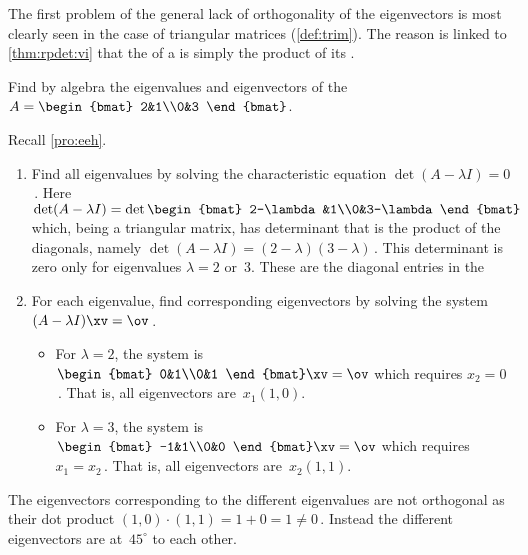 \begin{enumerate}
\end{enumerate}


The first problem of the general lack of orthogonality of the eigenvectors is most clearly seen in the case of triangular matrices (\cref{def:trim}).
The reason is  linked to \cref{thm:rpdet:vi} that the  of a  is simply the product of its .

\begin{example} 
Find by algebra the eigenvalues and eigenvectors of the  \(A=\begin{bmat} 2&1\\0&3 \end{bmat}\).
\begin{solution} 
Recall \cref{pro:eeh}. 
\begin{enumerate}
\item Find all eigenvalues by solving the characteristic equation \(\det(A-\lambda I)=0\)\,. 
Here \(\det(A-\lambda I)=\det\begin{bmat} 2-\lambda&1\\0&3-\lambda \end{bmat}\) which, being a triangular matrix, has determinant that is the product of the diagonals, namely \(\det(A-\lambda I)=(2-\lambda)(3-\lambda)\)\,.
This determinant is zero only for eigenvalues \(\lambda=2\) or~\(3\).
These are the diagonal entries in the 
\item For each eigenvalue, find corresponding eigenvectors by solving the system \((A-\lambda I)\xv=\ov\)\,.
\begin{itemize}
\item For \(\lambda=2\), the system is \(\begin{bmat} 0&1\\0&1 \end{bmat}\xv=\ov\) which requires \(x_2=0\)\,.  That is, all eigenvectors are~\(x_1(1,0)\).
\item For \(\lambda=3\), the system is \(\begin{bmat} -1&1\\0&0 \end{bmat}\xv=\ov\) which requires \(x_1=x_2\)\,.  That is, all eigenvectors are~\(x_2(1,1)\).
\end{itemize}
\end{enumerate}
The eigenvectors corresponding to the different eigenvalues are not orthogonal as their dot product \((1,0)\cdot(1,1)=1+0=1\neq 0\)\,. 
Instead the different eigenvectors are at~\(45^\circ\) to each other.
\end{solution}
\end{example}



